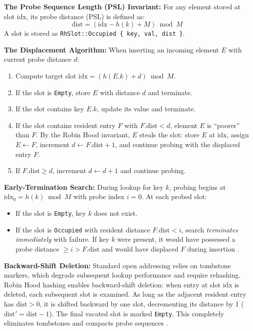 \documentclass[conference]{IEEEtran}
\begin{document}
\textbf{The Probe Sequence Length (PSL) Invariant:} For any element stored at slot $\text{idx}$, its probe distance (PSL) is defined as:
\begin{equation}
\text{dist} = (\text{idx} - h(k) + M) \bmod M
\end{equation}
A slot is stored as \texttt{RhSlot::Occupied \{ key, val, dist \}}.

\textbf{The Displacement Algorithm:} When inserting an incoming element $E$ with current probe distance $d$:
\begin{enumerate}
  \item Compute target slot $\text{idx} = (h(E.k) + d) \bmod M$.
  \item If the slot is \texttt{Empty}, store $E$ with distance $d$ and terminate.
  \item If the slot contains key $E.k$, update its value and terminate.
  \item If the slot contains resident entry $F$ with $F.\text{dist} < d$, element $E$ is ``poorer'' than $F$. By the Robin Hood invariant, $E$ steals the slot: store $E$ at $\text{idx}$, assign $E \leftarrow F$, increment $d \leftarrow F.\text{dist} + 1$, and continue probing with the displaced entry $F$.
  \item If $F.\text{dist} \ge d$, increment $d \leftarrow d + 1$ and continue probing.
\end{enumerate}

\textbf{Early-Termination Search:} During lookup for key $k$, probing begins at $\text{idx}_0 = h(k) \bmod M$ with probe index $i = 0$. At each probed slot:
\begin{itemize}
  \item If the slot is \texttt{Empty}, key $k$ does not exist.
  \item If the slot is \texttt{Occupied} with resident distance $F.\text{dist} < i$, search \emph{terminates immediately} with failure. If key $k$ were present, it would have possessed a probe distance $\ge i > F.\text{dist}$ and would have displaced $F$ during insertion \cite{celis1986}.
\end{itemize}

\textbf{Backward-Shift Deletion:} Standard open addressing relies on tombstone markers, which degrade subsequent lookup performance and require rehashing. Robin Hood hashing enables backward-shift deletion: when entry at slot $\text{idx}$ is deleted, each subsequent slot is examined. As long as the adjacent resident entry has $\text{dist} > 0$, it is shifted backward by one slot, decrementing its distance by 1 ($\text{dist}' = \text{dist} - 1$). The final vacated slot is marked \texttt{Empty}. This completely eliminates tombstones and compacts probe sequences \cite{celis1986}.
\end{document}
